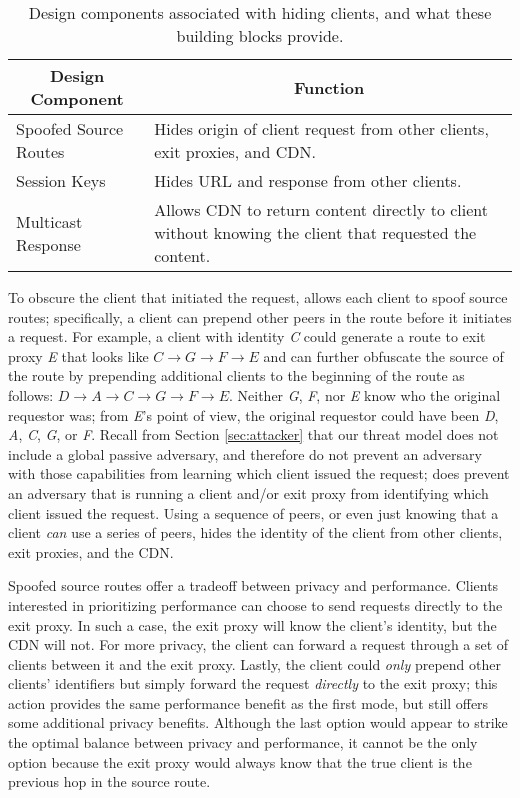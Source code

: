 \begin{table}[t!]
\small
\centering
\begin{tabular}{ l  p{1.9in} } 
 \multicolumn{1}{c}{\bf Design Component} & \multicolumn{1}{c}{\bf Function} \\
\hline \hline
Spoofed Source Routes & {Hides origin of client request from other
 clients, exit proxies, and CDN.} \\
 Session Keys & {Hides URL and response from other clients.} \\
 Multicast Response & {Allows CDN to return content directly to client without knowing
 the client that requested the content.} \\
 \hline
\end{tabular}
\caption{Design components associated with hiding clients, and what these 
building blocks provide.}
\label{tab:request_response}
\end{table}

To obscure the client that initiated the request, \system{}
allows each client to spoof source routes; specifically, a client can prepend
other peers in the route before it initiates a request.  For example, a client
with identity {\it C} could generate a route to exit proxy {\it E} that looks
like $C \rightarrow G \rightarrow F \rightarrow E$ and can further obfuscate
the source of the route by prepending additional clients to the beginning of
the route as follows: $D \rightarrow A \rightarrow C \rightarrow G \rightarrow
F \rightarrow E$. Neither {\it G}, {\it F}, nor {\it E} know who the original requestor was; from {\it E}'s point of 
view, the original requestor could have been {\it D}, {\it A}, {\it C}, {\it G},
or {\it F}.  Recall from Section \ref{sec:attacker} that our threat model does not 
include a global passive adversary, and therefore do not prevent an adversary with those capabilities 
from learning which client issued the request; \system{} does prevent an adversary that is running a 
client and/or exit proxy from identifying which client issued the request. Using a sequence of 
peers, or even just knowing that a client {\it can} use a series of peers, hides
the identity of the client 
from other clients, exit proxies, and the CDN. 

Spoofed source routes offer a tradeoff between privacy and performance. Clients interested in prioritizing performance can choose to send requests directly to the exit proxy. In such a case, the exit proxy will know the client's identity, but the CDN will not. For more privacy, the client can forward a request through a set of clients between it and the exit proxy. Lastly, the client could {\it only} prepend other clients' identifiers but simply forward the request {\em directly} to the exit proxy; this action provides the same performance benefit as the first mode, but still offers some additional privacy benefits. Although the last option would appear to strike the optimal balance between privacy and performance, it cannot be the only option because the exit proxy would always know that the true client is the previous hop in the source route. %


